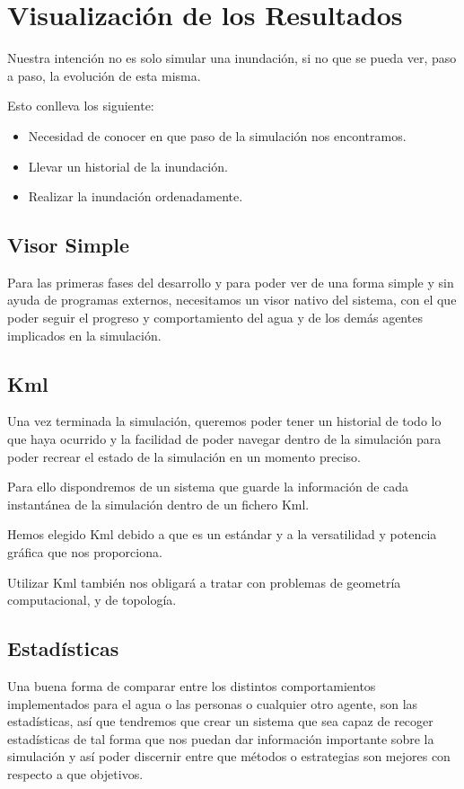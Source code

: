 \section*{Visualización de los Resultados}

Nuestra intención no es solo simular una inundación, si no que se pueda ver,
paso a paso, la evolución de esta misma. 

Esto conlleva los siguiente:
\begin {itemize}
\item Necesidad de conocer en que paso de la simulación nos encontramos.
\item Llevar un historial de la inundación.
\item Realizar la inundación ordenadamente.
\end {itemize}

\subsection*{Visor Simple}
Para las primeras fases del desarrollo y para poder ver de una forma simple y
sin ayuda de programas externos, necesitamos un visor nativo del sistema, con
el que poder seguir el progreso y comportamiento del agua y de los demás
agentes implicados en la simulación.
\subsection*{Kml}

Una vez terminada la simulación, queremos poder tener un historial de todo lo
que haya ocurrido y la facilidad de poder navegar dentro de la simulación para
poder recrear el estado de la simulación en un momento preciso.

Para ello dispondremos de un sistema que guarde la información de cada
instantánea de la simulación dentro de un fichero Kml.

Hemos elegido Kml debido a que es un estándar y a la versatilidad y potencia
gráfica que nos proporciona.

Utilizar Kml también nos obligará a tratar con problemas de geometría
computacional, y de topología. 

\subsection*{Estadísticas}
Una buena forma de comparar entre los distintos comportamientos implementados
para el agua o las personas o cualquier otro agente, son las estadísticas, así
que tendremos que crear un sistema que sea capaz de recoger estadísticas de tal
forma que nos puedan dar información importante sobre la simulación y así poder
discernir entre que métodos o estrategias son mejores con respecto a que
objetivos.
